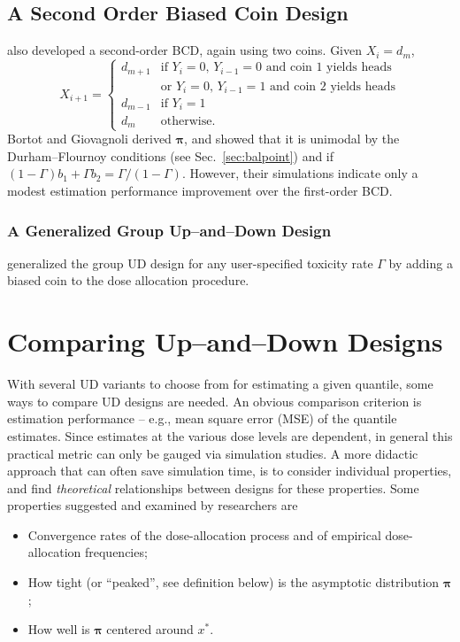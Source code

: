 \section{A Second Order Biased Coin Design}
\cite{Bort:Giov:Upan:2005} also developed a second-order BCD, again using two coins. Given $X_i=d_m$,
%
\begin{equation*}
X_{i+1}=
\begin{cases}
d_{m+1} &\textrm{if $Y_i=0$, $Y_{i-1}=0$ and coin 1 yields heads}\\
        &\textrm{or $Y_i=0$, $Y_{i-1}=1$ and coin 2 yields heads}\\
d_{m-1} &\textrm{if $Y_i=1$}\\
d_m &\textrm{otherwise.}
\end{cases}
\end{equation*}
%
Bortot and Giovagnoli derived $\boldsymbol{\pi}$, and showed that it is unimodal by the Durham--Flournoy conditions (see Sec.~\ref{sec:balpoint}) and if $(1-\Gamma )b_1+\Gamma b_2=\Gamma /(1-\Gamma )$. However, their simulations indicate only a modest estimation performance improvement over the first-order BCD.

\subsection{A Generalized Group Up--and--Down Design}
\cite{Bald:Bort:Giov:2008} generalized the group UD design for any user-specified toxicity rate $\Gamma$ by adding a biased coin to the dose allocation procedure.

\chapter{Comparing Up--and--Down Designs}

With several UD variants to choose from for estimating a given quantile, some ways to compare UD designs are needed. An obvious comparison criterion is estimation performance -- e.g., mean square error (MSE) of the quantile estimates. Since estimates at the various dose levels are dependent, in general this practical metric can only be gauged via simulation studies. A more didactic approach that can often save simulation time, is to consider individual properties, and find \emph{theoretical} relationships between designs for these properties. Some properties suggested and examined by researchers are
%
\begin{itemize}
\item Convergence rates of the dose-allocation process and of empirical dose-allocation frequencies;
\item How tight (or ``peaked'', see definition below) is the asymptotic distribution $\boldsymbol{\pi}$;
\item How well is $\boldsymbol{\pi}$ centered around $x^*$.
\end{itemize}

